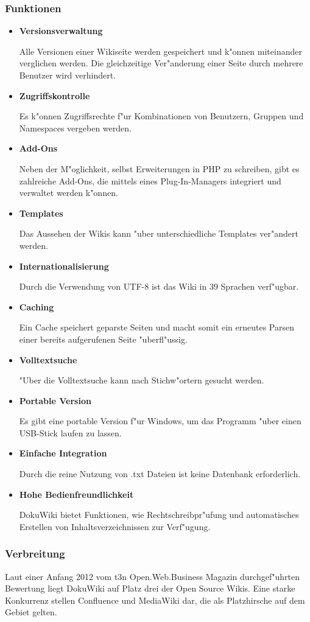 \subsubsection*{Funktionen}
\begin{itemize}
\item \textbf{Versionsverwaltung}

Alle Versionen einer Wikiseite werden gespeichert und k"onnen miteinander verglichen werden. Die gleichzeitige Ver"anderung einer Seite durch mehrere Benutzer wird verhindert.
\item \textbf{Zugriffskontrolle}

Es k"onnen Zugriffsrechte f"ur Kombinationen von Benutzern, Gruppen und Namespaces vergeben werden.
\item \textbf{Add-Ons}

Neben der M"oglichkeit, selbst Erweiterungen in PHP zu schreiben, gibt es zahlreiche Add-Ons, die mittels eines Plug-In-Managers integriert und verwaltet werden k"onnen.
\item \textbf{Templates}

Das Aussehen der Wikis kann "uber unterschiedliche Templates ver"andert werden.
\item \textbf{Internationalisierung}

Durch die Verwendung von UTF-8 ist das Wiki in 39 Sprachen verf"ugbar.
\item \textbf{Caching}

Ein Cache speichert geparste Seiten und macht somit ein erneutes Parsen einer bereits aufgerufenen Seite "uberfl"ussig.
\item \textbf{Volltextsuche}

"Uber die Volltextsuche kann nach Stichw"ortern gesucht werden.
\item \textbf{Portable Version}

Es gibt eine portable Version f"ur Windows, um das Programm "uber einen USB-Stick laufen zu lassen.
\item \textbf{Einfache Integration}

Durch die reine Nutzung von .txt Dateien ist keine Datenbank erforderlich.
\item \textbf{Hohe Bedienfreundlichkeit}

DokuWiki bietet Funktionen, wie Rechtschreibpr"ufung und automatisches Erstellen von Inhaltsverzeichnissen zur Verf"ugung. 
\end{itemize}

\subsubsection*{Verbreitung}
Laut einer Anfang 2012 vom t3n Open.Web.Business Magazin durchgef"uhrten Bewertung liegt DokuWiki auf Platz drei der Open Source Wikis. Eine starke Konkurrenz stellen Confluence und MediaWiki dar, die als Platzhirsche auf dem Gebiet gelten.

